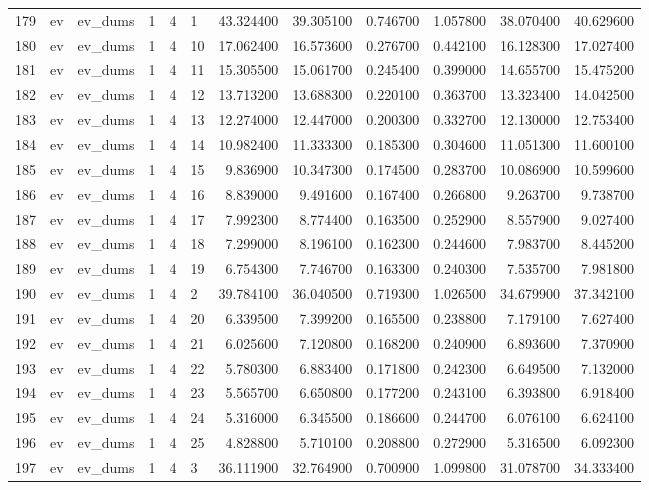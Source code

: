\begin{tabular}{llllllrrrrrr}
179 & ev & ev_dums & 1 & 4 & 1 & 43.324400 & 39.305100 & 0.746700 & 1.057800 & 38.070400 & 40.629600 \\
180 & ev & ev_dums & 1 & 4 & 10 & 17.062400 & 16.573600 & 0.276700 & 0.442100 & 16.128300 & 17.027400 \\
181 & ev & ev_dums & 1 & 4 & 11 & 15.305500 & 15.061700 & 0.245400 & 0.399000 & 14.655700 & 15.475200 \\
182 & ev & ev_dums & 1 & 4 & 12 & 13.713200 & 13.688300 & 0.220100 & 0.363700 & 13.323400 & 14.042500 \\
183 & ev & ev_dums & 1 & 4 & 13 & 12.274000 & 12.447000 & 0.200300 & 0.332700 & 12.130000 & 12.753400 \\
184 & ev & ev_dums & 1 & 4 & 14 & 10.982400 & 11.333300 & 0.185300 & 0.304600 & 11.051300 & 11.600100 \\
185 & ev & ev_dums & 1 & 4 & 15 & 9.836900 & 10.347300 & 0.174500 & 0.283700 & 10.086900 & 10.599600 \\
186 & ev & ev_dums & 1 & 4 & 16 & 8.839000 & 9.491600 & 0.167400 & 0.266800 & 9.263700 & 9.738700 \\
187 & ev & ev_dums & 1 & 4 & 17 & 7.992300 & 8.774400 & 0.163500 & 0.252900 & 8.557900 & 9.027400 \\
188 & ev & ev_dums & 1 & 4 & 18 & 7.299000 & 8.196100 & 0.162300 & 0.244600 & 7.983700 & 8.445200 \\
189 & ev & ev_dums & 1 & 4 & 19 & 6.754300 & 7.746700 & 0.163300 & 0.240300 & 7.535700 & 7.981800 \\
190 & ev & ev_dums & 1 & 4 & 2 & 39.784100 & 36.040500 & 0.719300 & 1.026500 & 34.679900 & 37.342100 \\
191 & ev & ev_dums & 1 & 4 & 20 & 6.339500 & 7.399200 & 0.165500 & 0.238800 & 7.179100 & 7.627400 \\
192 & ev & ev_dums & 1 & 4 & 21 & 6.025600 & 7.120800 & 0.168200 & 0.240900 & 6.893600 & 7.370900 \\
193 & ev & ev_dums & 1 & 4 & 22 & 5.780300 & 6.883400 & 0.171800 & 0.242300 & 6.649500 & 7.132000 \\
194 & ev & ev_dums & 1 & 4 & 23 & 5.565700 & 6.650800 & 0.177200 & 0.243100 & 6.393800 & 6.918400 \\
195 & ev & ev_dums & 1 & 4 & 24 & 5.316000 & 6.345500 & 0.186600 & 0.244700 & 6.076100 & 6.624100 \\
196 & ev & ev_dums & 1 & 4 & 25 & 4.828800 & 5.710100 & 0.208800 & 0.272900 & 5.316500 & 6.092300 \\
197 & ev & ev_dums & 1 & 4 & 3 & 36.111900 & 32.764900 & 0.700900 & 1.099800 & 31.078700 & 34.333400 \\

\end{tabular}
